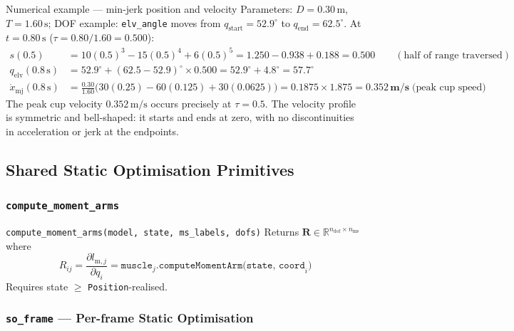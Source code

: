 \documentclass[11pt,a4paper]{article}
\newcommand{\dof}[1]{\texttt{\small #1}}
\newcommand{\R}{\mathbb{R}}
\newcommand{\bR}{\bm{R}}
\begin{document}
\begin{notebox}[PipeBlue]{Numerical example --- min-jerk position and velocity}
Parameters: $D=0.30\,\text{m}$, $T=1.60\,\text{s}$; DOF example:
\dof{elv\_angle} moves from $q_\text{start}=52.9^\circ$ to $q_\text{end}=62.5^\circ$.
At $t=0.80\,\text{s}$ ($\tau=0.80/1.60=0.500$):
\begin{align*}
s(0.5) &= 10(0.5)^3 - 15(0.5)^4 + 6(0.5)^5
        = 1.250 - 0.938 + 0.188 = \mathbf{0.500}
        \qquad(\text{half of range traversed})\\[4pt]
q_\text{elv}(0.8\,\text{s}) &= 52.9^\circ + (62.5-52.9)^\circ\times0.500
        = 52.9^\circ + 4.8^\circ = \mathbf{57.7^\circ}\\[4pt]
\dot{x}_\text{mj}(0.8\,\text{s})
  &= \tfrac{0.30}{1.60}\bigl(30(0.25)-60(0.125)+30(0.0625)\bigr)
   = 0.1875\times1.875 = \mathbf{0.352\,\text{m/s}} \;\text{(peak cup speed)}
\end{align*}
The peak cup velocity $0.352\,\text{m/s}$ occurs precisely at $\tau=0.5$.
The velocity profile is symmetric and bell-shaped: it starts and ends at
zero, with no discontinuities in acceleration or jerk at the endpoints.
\end{notebox}

\subsection{Shared Static Optimisation Primitives}

\subsubsection{\texttt{compute\_moment\_arms}}

\begin{eqbox}{\texttt{compute\_moment\_arms(model, state, ms\_labels, dofs)}}
Returns $\bR \in \R^{n_\text{dof} \times n_\text{ms}}$ where
\begin{equation}
R_{ij} = \frac{\partial l_{\text{m},j}}{\partial q_i}
       = \texttt{muscle}_j\texttt{.computeMomentArm(state, coord}_i\texttt{)}
\end{equation}
Requires state $\geq$ \texttt{Position}-realised.
\end{eqbox}

\subsubsection{\texttt{so\_frame} — Per-frame Static Optimisation}
\end{document}

